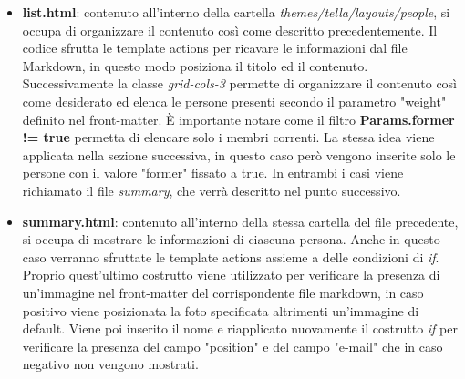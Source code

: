 \documentclass[target=bach,aauheader=]{thud}
\begin{document}
\begin{itemize}
    \item \textbf{list.html}: contenuto all'interno della cartella \textit{themes/tella/layouts/people}, si occupa di organizzare il contenuto così come descritto precedentemente.
    \newline
    Il codice sfrutta le template actions per ricavare le informazioni dal file Markdown, in questo modo posiziona il titolo ed il contenuto. Successivamente la classe \textit{grid-cols-3} permette di organizzare il contenuto così come desiderato ed elenca le persone presenti secondo il parametro "weight" definito nel front-matter.
    È importante notare come il filtro \textbf{Params.former != true} permetta di elencare solo i membri correnti.
    \newline
    La stessa idea viene applicata nella sezione successiva, in questo caso però vengono inserite solo le persone con il valore "former" fissato a true.
    \newline
    In entrambi i casi viene richiamato il file \textit{summary}, che verrà descritto nel punto successivo.
    \item \textbf{summary.html}: contenuto all'interno della stessa cartella del file precedente, si occupa di mostrare le informazioni di ciascuna persona. Anche in questo caso verranno sfruttate le template actions assieme a delle condizioni di \textit{if}.
    Proprio quest'ultimo costrutto viene utilizzato per verificare la presenza di un'immagine nel front-matter del corrispondente file markdown, in caso positivo viene posizionata la foto specificata altrimenti un'immagine di default. 
    Viene poi inserito il nome e riapplicato nuovamente il costrutto \textit{if} per verificare la presenza del campo "position" e del campo "e-mail" che in caso negativo non vengono mostrati.  
\end{itemize} 
\end{document}
